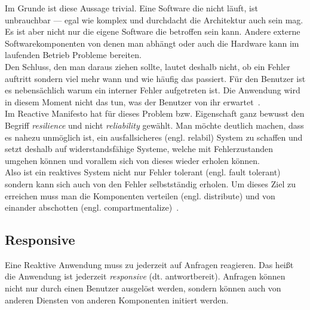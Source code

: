 Im Grunde ist diese Aussage trivial. Eine Software die nicht läuft, ist unbrauchbar --- egal wie komplex und durchdacht die Architektur auch sein mag.\\
Es ist aber nicht nur die eigene Software die betroffen sein kann. Andere externe Softwarekomponenten von denen man abhängt oder auch die Hardware kann im laufenden Betrieb Probleme bereiten.\\
Den Schluss, den man daraus ziehen sollte, lautet deshalb nicht, ob ein Fehler auftritt sondern viel mehr wann und wie häufig das passiert. Für den Benutzer ist es nebensächlich warum ein interner Fehler aufgetreten ist. Die Anwendung wird in diesem Moment nicht das tun, was der Benutzer von ihr erwartet~\cite[S.~33ff]{kuhn_reactive_2015}.\\

Im Reactive Manifesto hat für dieses Problem bzw. Eigenschaft ganz bewusst den Begriff \textit{resilience} und nicht \textit{reliability} gewählt. Man möchte deutlich machen, dass es nahezu unmöglich ist, ein ausfallsicheres (engl. relabil) System zu schaffen und setzt deshalb auf widerstandsfähige Systeme, welche mit Fehlerzustanden umgehen können und vorallem sich von dieses wieder erholen können.\\
Also ist ein reaktives System nicht nur Fehler tolerant (engl. fault tolerant) sondern kann sich auch von den Fehler selbstständig erholen. Um dieses Ziel zu erreichen muss man die Komponenten verteilen (engl. distribute) und von einander abschotten (engl. compartmentalize)~\citetext{\cite[S.~7]{vernon_reactive_2016}~\cite[S.~34]{kuhn_reactive_2015}}.


\subsection{Responsive}\label{subsec:responsive}
Eine Reaktive Anwendung muss zu jederzeit auf Anfragen reagieren. Das heißt die Anwendung ist jederzeit \textit{responsive} (dt. antwortbereit). Anfragen können nicht nur durch einen Benutzer ausgelöst werden, sondern können auch von anderen Diensten von anderen Komponenten initiert werden.


\pagebreak

